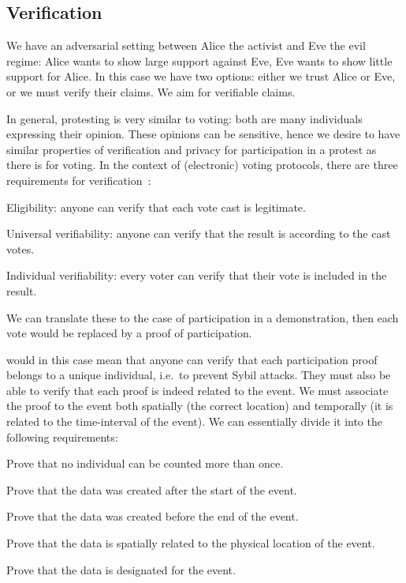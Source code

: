 \subsection{Verification}%
\label{Verification}

We have an adversarial setting between Alice the activist and Eve the evil 
regime: Alice wants to show large support against Eve, Eve wants to show little
support for Alice.
In this case we have two options:
either we trust Alice or Eve, or we must verify their claims.
We aim for verifiable claims.

In general, protesting is very similar to voting: both are many individuals 
expressing their opinion.
These opinions can be sensitive, hence we desire to have similar properties of 
verification and privacy for participation in a protest as there is for voting.
In the context of (electronic) voting protocols, there are three requirements 
for verification~\cite{VerifyingPrivacyPropertiesOfVotingProtocols}:
\begin{frame}
\begin{requirements}[V]
\item\label{EligibilityVerif} Eligibility: anyone can verify that each vote 
  cast is legitimate.
\item\label{UniversalVerif} Universal verifiability: anyone can verify that the 
  result is according to the cast votes.
\item\label{IndividualVerif} Individual verifiability: every voter can verify 
  that their vote is included in the result.
\end{requirements}
\end{frame}
We can translate these to the case of participation in a demonstration, then 
each vote would be replaced by a proof of participation.

 would in this case mean that anyone can verify that 
each participation proof belongs to a unique individual, i.e.\ to prevent Sybil 
attacks.
They must also be able to verify that each proof is indeed related to the 
event.
We must associate the proof to the event both spatially (the correct location) 
and temporally (it is related to the time-interval of the event).
We can essentially divide it into the following requirements:
\begin{requirements}
  \item\label{CountOnce} Prove that no individual can be counted more than 
    once.
  \item\label{CreatedAfterStart} Prove that the data was created after the 
    start of the event.
  \item\label{CreatedBeforeEnd} Prove that the data was created before the end 
    of the event.
  \item\label{SpatiallyRelated} Prove that the data is spatially related to the 
    physical location of the event.
  \item\label{DesignatedEvent} Prove that the data is designated for the event.
\end{requirements}


